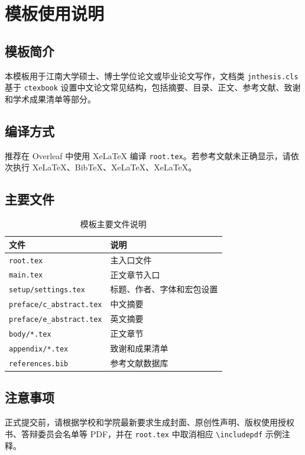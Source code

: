 
\chapter{模板使用说明}
\label{ch:template-guide}

\section{模板简介}

本模板用于江南大学硕士、博士学位论文或毕业论文写作，文档类 \texttt{jnthesis.cls} 基于 \texttt{ctexbook} 设置中文论文常见结构，包括摘要、目录、正文、参考文献、致谢和学术成果清单等部分。

\section{编译方式}

推荐在 Overleaf 中使用 XeLaTeX 编译 \texttt{root.tex}。若参考文献未正确显示，请依次执行 XeLaTeX、BibTeX、XeLaTeX、XeLaTeX。

\section{主要文件}

\begin{table}[htbp]
  \centering
  \caption{模板主要文件说明}
  \begin{tabular}{ll}
    \toprule
    文件 & 说明 \\
    \midrule
    \texttt{root.tex} & 主入口文件 \\
    \texttt{main.tex} & 正文章节入口 \\
    \texttt{setup/settings.tex} & 标题、作者、字体和宏包设置 \\
    \texttt{preface/c\_abstract.tex} & 中文摘要 \\
    \texttt{preface/e\_abstract.tex} & 英文摘要 \\
    \texttt{body/*.tex} & 正文章节 \\
    \texttt{appendix/*.tex} & 致谢和成果清单 \\
    \texttt{references.bib} & 参考文献数据库 \\
    \bottomrule
  \end{tabular}
\end{table}

\section{注意事项}

正式提交前，请根据学校和学院最新要求生成封面、原创性声明、版权使用授权书、答辩委员会名单等 PDF，并在 \texttt{root.tex} 中取消相应 \texttt{\textbackslash includepdf} 示例注释。
